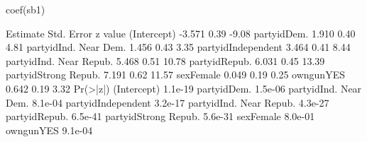 \begin{Schunk}
\begin{Sinput}
 coef(sb1)
\end{Sinput}
\begin{Soutput}
                        Estimate Std. Error z value
(Intercept)               -3.571       0.39   -9.08
partyidDem.                1.910       0.40    4.81
partyidInd. Near Dem.      1.456       0.43    3.35
partyidIndependent         3.464       0.41    8.44
partyidInd. Near Repub.    5.468       0.51   10.78
partyidRepub.              6.031       0.45   13.39
partyidStrong Repub.       7.191       0.62   11.57
sexFemale                  0.049       0.19    0.25
owngunYES                  0.642       0.19    3.32
                        Pr(>|z|)
(Intercept)              1.1e-19
partyidDem.              1.5e-06
partyidInd. Near Dem.    8.1e-04
partyidIndependent       3.2e-17
partyidInd. Near Repub.  4.3e-27
partyidRepub.            6.5e-41
partyidStrong Repub.     5.6e-31
sexFemale                8.0e-01
owngunYES                9.1e-04
\end{Soutput}
\end{Schunk}
